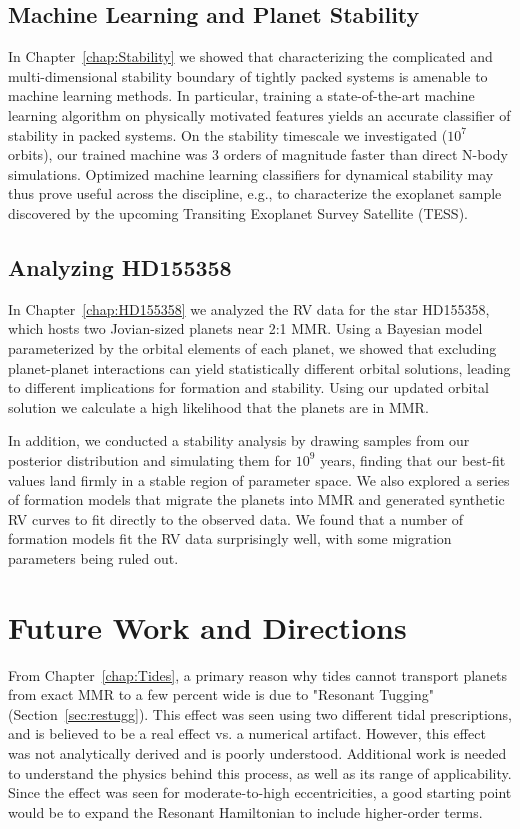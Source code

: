 \subsection{Machine Learning and Planet Stability}
In Chapter~\ref{chap:Stability} we showed that characterizing the complicated and multi-dimensional stability boundary of tightly packed systems is amenable to machine learning methods. 
In particular, training a state-of-the-art machine learning algorithm on physically motivated features yields an accurate classifier of stability in packed systems. 
On the stability timescale we investigated ($10^7$ orbits), our trained machine was 3 orders of magnitude faster than direct N-body simulations. 
Optimized machine learning classifiers for dynamical stability may thus prove useful across the discipline, e.g., to characterize the exoplanet sample discovered by the upcoming Transiting Exoplanet Survey Satellite (TESS).

\subsection{Analyzing HD155358}
In Chapter~\ref{chap:HD155358} we analyzed the RV data for the star HD155358, which hosts two Jovian-sized planets near 2:1 MMR. 
Using a Bayesian model parameterized by the orbital elements of each planet, we showed that excluding planet-planet interactions can yield statistically different orbital solutions, leading to different implications for formation and stability. 
Using our updated orbital solution we calculate a high likelihood that the planets are in MMR. 

In addition, we conducted a stability analysis by drawing samples from our posterior distribution and simulating them for $10^9$ years, finding that our best-fit values land firmly in a stable region of parameter space.
We also explored a series of formation models that migrate the planets into MMR and generated synthetic RV curves to fit directly to the observed data. 
We found that a number of formation models fit the RV data surprisingly well, with some migration parameters being ruled out.
\fi

\section{Future Work and Directions}
From Chapter~\ref{chap:Tides}, a primary reason why tides cannot transport planets from exact MMR to a few percent wide is due to "Resonant Tugging" (Section~\ref{sec:restugg}).
This effect was seen using two different tidal prescriptions, and is believed to be a real effect vs. a numerical artifact. 
However, this effect was not analytically derived and is poorly understood. 
Additional work is needed to understand the physics behind this process, as well as its range of applicability.
Since the effect was seen for moderate-to-high eccentricities, a good starting point would be to expand the Resonant Hamiltonian to include higher-order terms. 

